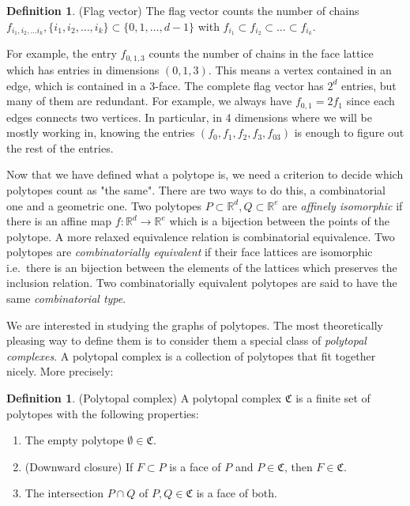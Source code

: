\documentclass[a4paper,12pt]{book}
\theoremstyle{plain}
\theoremstyle{definition}
\newtheorem{definition}[theorem]{Definition}
\begin{document}
\begin{definition}
 (Flag vector) The flag vector counts the number of chains $f_{i_1,i_2,\dots i_k}, \{i_1,i_2,\dots, i_k \} \subset \{0,1,\dots, d-1\}$
with $f_{i_1} \subset f_{i_2} \subset \dots \subset f_{i_k}$.
\end{definition}

For example, the entry $f_{0,1,3}$ counts the number of chains in the face 
lattice which has entries in dimensions $(0,1,3)$. This means a vertex contained in an
edge, which is contained in a 3-face. The complete flag vector has $2^d$ entries,
but many of them are redundant. For example, we always have $f_{0,1} = 2f_1$ since each edges
connects two vertices. In particular, in 4 dimensions where we will be mostly working in,
knowing the entries $(f_0, f_1, f_2, f_3, f_{03})$ is enough to figure out the rest of the entries. 

Now that we have defined what a polytope is, we need a criterion to decide which polytopes 
count as "the same". There are two ways to do this, a combinatorial one and a geometric one.
Two polytopes $P\subset \mathbb{R}^d, Q \subset \mathbb{R}^e$ are 
\textit{affinely isomorphic} if there is an affine map $f: \mathbb{R}^d 
\rightarrow \mathbb{R}^e$ which is a bijection between the points of the 
polytope. A more relaxed equivalence relation is combinatorial equivalence. Two 
polytopes are \textit{combinatorially equivalent} if their face lattices are isomorphic 
i.e.\ there is an bijection between the elements of the lattices which preserves
the inclusion relation. Two combinatorially equivalent polytopes are said to have the 
same \textit{combinatorial type}. 

We are interested in studying the graphs of polytopes. The most theoretically 
pleasing way to define them is to consider them a special class of 
\textit{polytopal complexes}.
A polytopal complex is a collection of polytopes that fit together nicely.
More precisely:
\begin{definition}
 (Polytopal complex) A polytopal complex $\mathfrak{C}$ is a finite set of 
polytopes with the following properties:
\begin{enumerate}
 \item The empty polytope $\emptyset \in \mathfrak{C}$.
  \item (Downward closure) If $F \subset P$ is a face of $P$ and $P \in 
\mathfrak{C}$, then 
$F \in \mathfrak{C}$.
\item The intersection $P\cap Q$ of $P,Q \in \mathfrak{C}$ is a face of both.

\end{enumerate}

\end{definition}
\end{document}
